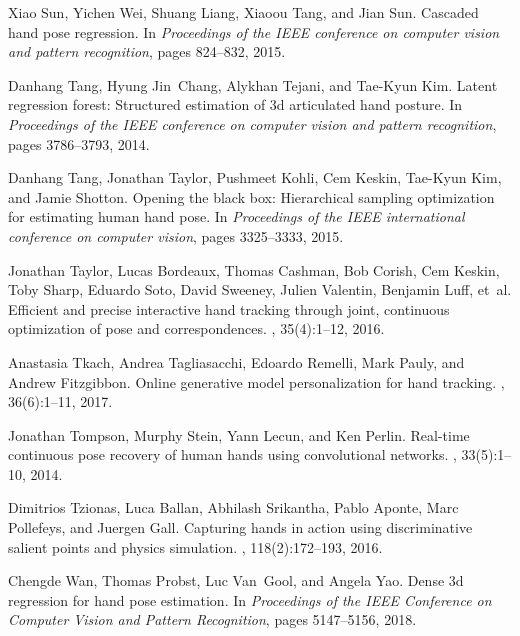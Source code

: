 \documentclass[10pt,twocolumn,letterpaper]{article}
\begin{document}
\begin{thebibliography}{10}
Xiao Sun, Yichen Wei, Shuang Liang, Xiaoou Tang, and Jian Sun.
\newblock Cascaded hand pose regression.
\newblock In {\em Proceedings of the IEEE conference on computer vision and
  pattern recognition}, pages 824--832, 2015.

Danhang Tang, Hyung Jin~Chang, Alykhan Tejani, and Tae-Kyun Kim.
\newblock Latent regression forest: Structured estimation of 3d articulated
  hand posture.
\newblock In {\em Proceedings of the IEEE conference on computer vision and
  pattern recognition}, pages 3786--3793, 2014.

Danhang Tang, Jonathan Taylor, Pushmeet Kohli, Cem Keskin, Tae-Kyun Kim, and
  Jamie Shotton.
\newblock Opening the black box: Hierarchical sampling optimization for
  estimating human hand pose.
\newblock In {\em Proceedings of the IEEE international conference on computer
  vision}, pages 3325--3333, 2015.

Jonathan Taylor, Lucas Bordeaux, Thomas Cashman, Bob Corish, Cem Keskin, Toby
  Sharp, Eduardo Soto, David Sweeney, Julien Valentin, Benjamin Luff, et~al.
\newblock Efficient and precise interactive hand tracking through joint,
  continuous optimization of pose and correspondences.
, 35(4):1--12, 2016.

Anastasia Tkach, Andrea Tagliasacchi, Edoardo Remelli, Mark Pauly, and Andrew
  Fitzgibbon.
\newblock Online generative model personalization for hand tracking.
, 36(6):1--11, 2017.

Jonathan Tompson, Murphy Stein, Yann Lecun, and Ken Perlin.
\newblock Real-time continuous pose recovery of human hands using convolutional
  networks.
, 33(5):1--10, 2014.

Dimitrios Tzionas, Luca Ballan, Abhilash Srikantha, Pablo Aponte, Marc
  Pollefeys, and Juergen Gall.
\newblock Capturing hands in action using discriminative salient points and
  physics simulation.
, 118(2):172--193,
  2016.

Chengde Wan, Thomas Probst, Luc Van~Gool, and Angela Yao.
\newblock Dense 3d regression for hand pose estimation.
\newblock In {\em Proceedings of the IEEE Conference on Computer Vision and
  Pattern Recognition}, pages 5147--5156, 2018.


\end{thebibliography}
\end{document}
